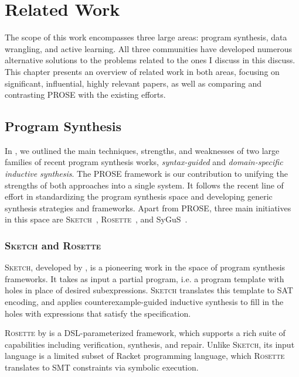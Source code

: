 \chapter{Related Work}
\label{ch:related}

The scope of this work encompasses three large areas: program synthesis, data wrangling, and active learning.
All three communities have developed numerous alternative solutions to the problems related to the ones I discuss in
this discuss.
This chapter presents an overview of related work in both areas, focusing on significant, influential, highly relevant
papers, as well as comparing and contrasting PROSE with the existing efforts.

\section{Program Synthesis}
\label{sec:related:synthesis}

In , we outlined the main techniques, strengths, and weaknesses of two large families of recent
program synthesis works, \emph{syntax-guided} and \emph{domain-specific inductive synthesis}.
The PROSE framework is our contribution to unifying the strengths of both approaches into a single system.
It follows the recent line of effort in standardizing the program synthesis space and developing generic synthesis
strategies and frameworks.
Apart from PROSE, three main initiatives in this space are \textsc{Sketch}~\cite{sketch},
\textsc{Rosette}~\cite{rosette}, and SyGuS~\cite{sygus}.

\subsection{\textsc{Sketch} and \textsc{Rosette}}
\textsc{Sketch}, developed by \citet{sketch}, is a pioneering work in the space of program synthesis frameworks.
It takes as input a partial program, i.e.
a program template with holes in place of desired subexpressions.
\textsc{Sketch} translates this template to SAT encoding, and applies counterexample-guided inductive synthesis to fill
in the holes with
expressions that satisfy the specification.

\textsc{Rosette} by \citet{rosette} is a DSL\hyp{}parameterized framework, which supports a rich suite of capabilities
including verification, synthesis, and repair.
Unlike \textsc{Sketch}, its input language is a limited subset of Racket programming language, which \textsc{Rosette}
translates to SMT constraints via symbolic execution.

